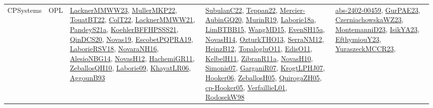 {\begin{longtable}{lp{3cm}>{\raggedright}p{6cm}>{\raggedright}p{6cm}p{8cm}}
CPSystems & OPL & \href{articles/LacknerMMWW23.pdf}{LacknerMMWW23}\cite{LacknerMMWW23}, \href{articles/MullerMKP22.pdf}{MullerMKP22}\cite{MullerMKP22}, \href{papers/TouatBT22.pdf}{TouatBT22}\cite{TouatBT22}, \href{articles/ColT22.pdf}{ColT22}\cite{ColT22}, \href{papers/LacknerMMWW21.pdf}{LacknerMMWW21}\cite{LacknerMMWW21}, \href{articles/PandeyS21a.pdf}{PandeyS21a}\cite{PandeyS21a}, \href{articles/KoehlerBFFHPSSS21.pdf}{KoehlerBFFHPSSS21}\cite{KoehlerBFFHPSSS21}, \href{articles/QinDCS20.pdf}{QinDCS20}\cite{QinDCS20}, \href{articles/Novas19.pdf}{Novas19}\cite{Novas19}, \href{articles/EscobetPQPRA19.pdf}{EscobetPQPRA19}\cite{EscobetPQPRA19}, \href{articles/LaborieRSV18.pdf}{LaborieRSV18}\cite{LaborieRSV18}, \href{articles/NovaraNH16.pdf}{NovaraNH16}\cite{NovaraNH16}, \href{papers/AlesioNBG14.pdf}{AlesioNBG14}\cite{AlesioNBG14}, \href{articles/NovasH12.pdf}{NovasH12}\cite{NovasH12}, \href{articles/HachemiGR11.pdf}{HachemiGR11}\cite{HachemiGR11}, \href{articles/ZeballosQH10.pdf}{ZeballosQH10}\cite{ZeballosQH10}, \href{papers/Laborie09.pdf}{Laborie09}\cite{Laborie09}, \href{articles/KhayatLR06.pdf}{KhayatLR06}\cite{KhayatLR06}, \href{articles/AggounB93.pdf}{AggounB93}\cite{AggounB93} & \href{articles/SubulanC22.pdf}{SubulanC22}\cite{SubulanC22}, \href{papers/Teppan22.pdf}{Teppan22}\cite{Teppan22}, \href{papers/Mercier-AubinGQ20.pdf}{Mercier-AubinGQ20}\cite{Mercier-AubinGQ20}, \href{papers/MurinR19.pdf}{MurinR19}\cite{MurinR19}, \href{papers/Laborie18a.pdf}{Laborie18a}\cite{Laborie18a}, \href{papers/LimBTBB15.pdf}{LimBTBB15}\cite{LimBTBB15}, \href{articles/WangMD15.pdf}{WangMD15}\cite{WangMD15}, \href{articles/EvenSH15a.pdf}{EvenSH15a}\cite{EvenSH15a}, \href{articles/NovasH14.pdf}{NovasH14}\cite{NovasH14}, \href{articles/OzturkTHO13.pdf}{OzturkTHO13}\cite{OzturkTHO13}, \href{papers/SerraNM12.pdf}{SerraNM12}\cite{SerraNM12}, \href{papers/HeinzB12.pdf}{HeinzB12}\cite{HeinzB12}, \href{articles/TopalogluO11.pdf}{TopalogluO11}\cite{TopalogluO11}, \href{papers/EdisO11.pdf}{EdisO11}\cite{EdisO11}, \href{articles/KelbelH11.pdf}{KelbelH11}\cite{KelbelH11}, \href{papers/ZibranR11a.pdf}{ZibranR11a}\cite{ZibranR11a}, \href{articles/NovasH10.pdf}{NovasH10}\cite{NovasH10}, \href{articles/Simonis07.pdf}{Simonis07}\cite{Simonis07}, \href{papers/GarganiR07.pdf}{GarganiR07}\cite{GarganiR07}, \href{papers/KrogtLPHJ07.pdf}{KrogtLPHJ07}\cite{KrogtLPHJ07}, \href{articles/Hooker06.pdf}{Hooker06}\cite{Hooker06}, \href{articles/ZeballosH05.pdf}{ZeballosH05}\cite{ZeballosH05}, \href{papers/QuirogaZH05.pdf}{QuirogaZH05}\cite{QuirogaZH05}, \href{papers/cp-Hooker05.pdf}{cp-Hooker05}\cite{cp-Hooker05}, \href{papers/VerfaillieL01.pdf}{VerfaillieL01}\cite{VerfaillieL01}, \href{papers/RodosekW98.pdf}{RodosekW98}\cite{RodosekW98} & \href{articles/abs-2402-00459.pdf}{abs-2402-00459}\cite{abs-2402-00459}, \href{articles/GurPAE23.pdf}{GurPAE23}\cite{GurPAE23}, \href{articles/CzerniachowskaWZ23.pdf}{CzerniachowskaWZ23}\cite{CzerniachowskaWZ23}, \href{articles/MontemanniD23.pdf}{MontemanniD23}\cite{MontemanniD23}, \href{articles/IsikYA23.pdf}{IsikYA23}\cite{IsikYA23}, \href{papers/EfthymiouY23.pdf}{EfthymiouY23}\cite{EfthymiouY23}, \href{articles/YuraszeckMCCR23.pdf}{YuraszeckMCCR23}\cite{YuraszeckMCCR23}, 
\end{longtable}}
